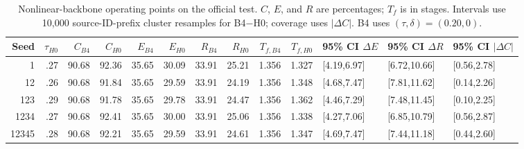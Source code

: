 \begin{table}[t]
\centering
\caption{Nonlinear-backbone operating points on the official test. $C$, $E$, and $R$ are percentages; $T_f$ is in stages. Intervals use 10,000 source-ID-prefix cluster resamples for B4$-$H0; coverage uses $|\Delta C|$. B4 uses $(\tau,\delta)=(0.20,0)$.}
\label{tab:nonlinear-operating}
\scriptsize
\setlength{\tabcolsep}{2.2pt}
\begin{tabular}{rrrrrrrrrrlll}
\toprule
Seed & $\tau_{H0}$ & $C_{B4}$ & $C_{H0}$ & $E_{B4}$ & $E_{H0}$ & $R_{B4}$ & $R_{H0}$ & $T_{f,B4}$ & $T_{f,H0}$ & 95\% CI $\Delta E$ & 95\% CI $\Delta R$ & 95\% CI $|\Delta C|$ \\
\midrule
1 & .27 & 90.68 & 92.36 & 35.65 & 30.09 & 33.91 & 25.21 & 1.356 & 1.327 & [4.19,6.97] & [6.72,10.66] & [0.56,2.78] \\
12 & .26 & 90.68 & 91.84 & 35.65 & 29.59 & 33.91 & 24.19 & 1.356 & 1.348 & [4.68,7.47] & [7.81,11.62] & [0.14,2.26] \\
123 & .29 & 90.68 & 91.78 & 35.65 & 29.78 & 33.91 & 24.47 & 1.356 & 1.362 & [4.46,7.29] & [7.48,11.45] & [0.10,2.25] \\
1234 & .27 & 90.68 & 92.41 & 35.65 & 30.00 & 33.91 & 25.06 & 1.356 & 1.338 & [4.27,7.06] & [6.85,10.79] & [0.56,2.87] \\
12345 & .28 & 90.68 & 92.21 & 35.65 & 29.59 & 33.91 & 24.61 & 1.356 & 1.347 & [4.69,7.47] & [7.44,11.18] & [0.44,2.60] \\
\bottomrule
\end{tabular}
\end{table}
